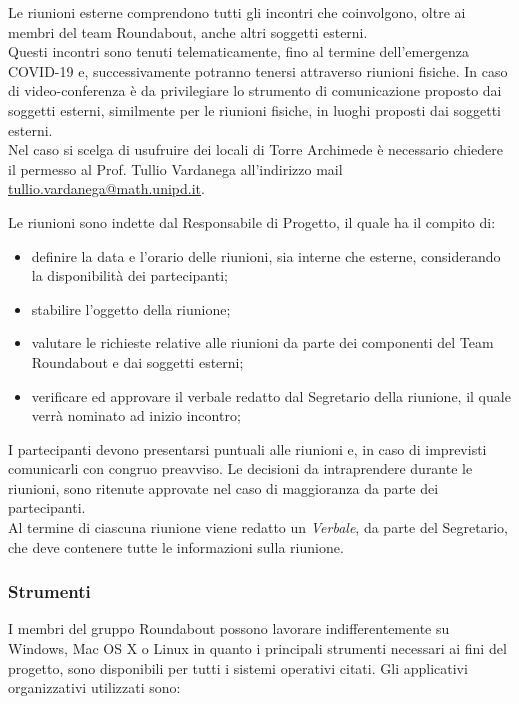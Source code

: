				Le riunioni esterne comprendono tutti gli incontri che coinvolgono, oltre ai membri del team Roundabout, anche altri soggetti esterni.\\
				Questi incontri sono tenuti telematicamente, fino al termine dell'emergenza COVID-19 e, successivamente potranno tenersi attraverso riunioni fisiche. In caso di video-conferenza è da privilegiare lo strumento di comunicazione proposto dai soggetti esterni, similmente per le riunioni fisiche, in luoghi proposti dai soggetti esterni.\\
				Nel caso si scelga di usufruire dei locali di Torre Archimede è necessario chiedere il permesso al Prof. Tullio Vardanega all'indirizzo mail \href{mailto:tullio.vardanega@math.unipd.it}{tullio.vardanega@math.unipd.it}.
			
				Le riunioni sono indette dal Responsabile di Progetto, il quale ha il compito di:
				\begin{itemize}
					\item definire la data e l'orario delle riunioni, sia interne che esterne, considerando la disponibilità dei partecipanti;
					\item stabilire l'oggetto della riunione;
					\item valutare le richieste relative alle riunioni da parte dei componenti del Team Roundabout e dai soggetti esterni;
					\item verificare ed approvare il verbale redatto dal Segretario della riunione, il quale verrà nominato ad inizio incontro;
				\end{itemize}
				I partecipanti devono presentarsi puntuali alle riunioni e, in caso di imprevisti comunicarli con congruo preavviso.
				Le decisioni da intraprendere durante le riunioni, sono ritenute approvate nel caso di maggioranza da parte dei partecipanti.\\
				Al termine di ciascuna riunione viene redatto un \textit{Verbale}, da parte del Segretario, che deve contenere tutte le informazioni sulla riunione.
		
		
		\subsubsection{Strumenti}
			I membri del gruppo Roundabout possono lavorare indifferentemente su Windows, Mac OS X o Linux in quanto i principali strumenti necessari ai fini del progetto, sono disponibili per tutti i sistemi operativi citati. Gli applicativi organizzativi utilizzati sono:
			
